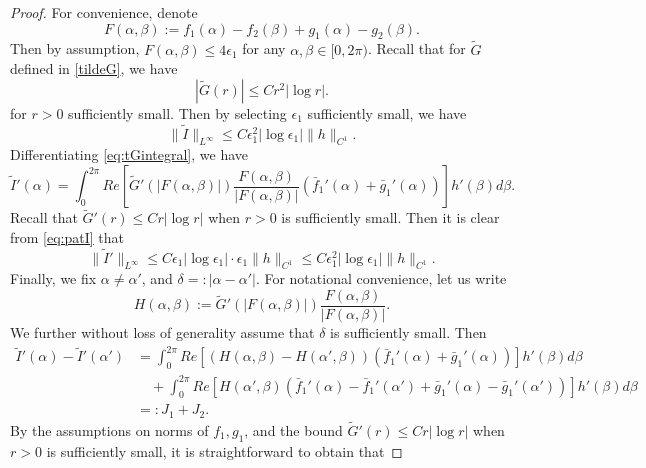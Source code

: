 \documentclass[11pt,reqno]{amsproc}
\newcommand{\eps}{\epsilon}
\begin{document}
\begin{proof}
For convenience, denote
$$
F(\alpha,\beta) := f_1(\alpha) - f_2(\beta) + g_1(\alpha) - g_2(\beta).
$$
Then by assumption, $F(\alpha,\beta) \le 4\eps_1 $ for any $\alpha,\beta \in [0,2\pi)$. Recall that for $\tilde G$ defined in \eqref{tildeG}, we have
$$
|\tilde G(r)| \le C r^2 |\log r|. 
$$
for $r > 0$ sufficiently small. Then by selecting $\eps_1$ sufficiently small, we have
\begin{equation}\label{est:tILinfty}
\|\tilde I\|_{L^\infty} \le C\eps_1^2 |\log\eps_1| \|h\|_{C^1}.
\end{equation}
Differentiating \eqref{eq:tGintegral}, we have
\begin{equation}
    \label{eq:patI}
    \tilde I'(\alpha) = \int_0^{2\pi} Re\left[\tilde G'(|F(\alpha,\beta)|)\frac{F(\alpha,
    \beta)}{|F(\alpha,\beta)|}(\bar{f}_1'(\alpha) + \bar{g}_1'(\alpha))\right]  h'(\beta) d\beta.
\end{equation}
Recall that $\tilde G'(r) \le Cr |\log r|$ when $r> 0$ is sufficiently small. Then it is clear from \eqref{eq:patI} that
\begin{equation}\label{est:tI'Linfty}
\|\tilde I'\|_{L^\infty} \le C\eps_1 |\log \eps_1| \cdot \eps_1 \|h\|_{C^1} \le C\eps_1^2 |\log\eps_1| \|h\|_{C^1}.
\end{equation}
Finally, we fix $\alpha \neq \alpha'$, and $\delta =: |\alpha - \alpha'|$. For notational convenience, let us write
\begin{equation}
    \label{eq:H}
    H(\alpha,\beta) := \tilde{G}'(|F(\alpha,\beta)|) \frac{F(\alpha,\beta)}{|F(\alpha,\beta)|}.
\end{equation}
We further without loss of generality assume that $\delta$ is sufficiently small. Then
\begin{equation}\label{eq:difftI}
\begin{aligned}
    \tilde I'(\alpha) - \tilde I'(\alpha') &= \int_0^{2\pi} Re\left[(H(\alpha,\beta) - H(\alpha',\beta))(\bar{f}_1'(\alpha) + \bar{g}_1'(\alpha))\right]h'(\beta) d\beta\\
    & \quad + \int_0^{2\pi} Re\left[H(\alpha',\beta)(\bar{f}_1'(\alpha) - \bar{f}_1'(\alpha') + \bar{g}_1'(\alpha)-\bar{g}_1'(\alpha'))\right]  h'(\beta) d\beta\\
    &=: J_1 + J_2.
\end{aligned}
\end{equation}
By the assumptions on norms of $f_1, g_1$, and the bound $\tilde G'(r) \le Cr |\log r|$ when $r> 0$ is sufficiently small, it is straightforward to obtain that

\end{proof}
\end{document}
